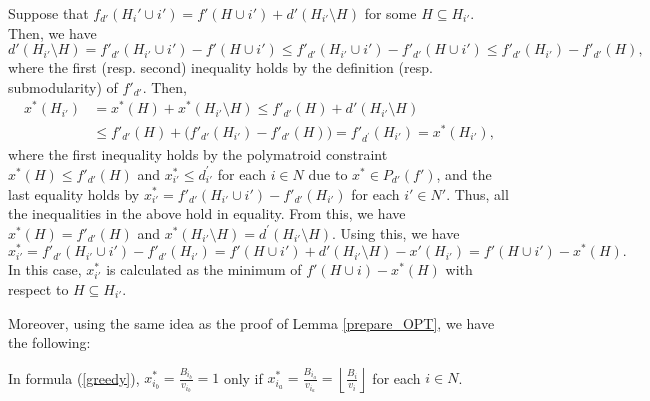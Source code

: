 \documentclass[letterpaper,11pt]{article}
\begin{document}
	Suppose that $f_{d'}(H_i'\cup i')=f'(H\cup i')+d'(H_{i'}\setminus H)$ for some $H\subseteq H_{i'}$.
	Then, we have 
	\[
	d'(H_{i'}\setminus H)=f'_{d'}(H_{i'}\cup i')-f'(H\cup i')\leq f'_{d'}(H_{i'}\cup i')-f'_{d'}(H\cup i')\leq f'_{d'}(H_{i'})-f'_{d'}(H),
	\]
	where the first (resp. second) inequality holds by the definition (resp. submodularity) of $f'_{d'}$.
	Then, 
	\begin{align*}
	x^{*}(H_{i'})&=x^{*}(H)+x^{*}(H_{i'}\setminus H)\leq f'_{d'}(H)+d'(H_{i'}\setminus H)\\
	&\leq f'_{d'}(H)+\bigl(f'_{d'}(H_{i'})-f'_{d'}(H)\bigr)=f'_{d^{'}}(H_{i'})=x^{*}(H_{i'}), 
	\end{align*}
	where the first inequality holds by the polymatroid constraint $x^{*}(H)\leq f'_{d'}(H)$ and 
	$x^{*}_{i'}\leq d^{'}_{i'}$ for each $i\in N$ due to $x^{*}\in P_{d'}(f')$, 
	and the last equality holds by $x^*_{i'}=f'_{d'}(H_{i'}\cup i')-f'_{d'}(H_{i'})$ for each $i'\in N'$.
	Thus, all the inequalities in the above hold in equality.
	From this, we have $x^{*}(H)=f'_{d'}(H)$ and $x^{*}(H_{i'}\setminus H)=d^{'}(H_{i'}\setminus H)$.
	Using this, we have 
	\[
	x^*_{i'}=f'_{d'}(H_{i'}\cup i')-f'_{d'}(H_{i'})=f'(H\cup {i'})+d'(H_{i'}\setminus H)-x'(H_{i'})
	=f'(H\cup i')-x^{*}(H).
	\]
	In this case, $x^*_{i'}$ is calculated as the minimum of $f'(H\cup i)-x^{*}(H)$ with respect to $H\subseteq H_{i'}$.
	
	Moreover, using the same idea as the proof of Lemma \ref{prepare_OPT}, we have the following:
	\begin{observation}
	\label{greedy_property}
	In formula (\ref{greedy}), $x^*_{i_{b}}=\frac{B_{i_b}}{v_{i_b}}=1$ only if $x^*_{i_{a}}
	=\frac{B_{i_a}}{v_{i_a}}=\left\lfloor \frac{B_i}{v_i}\right\rfloor$ for each $i\in N$. 
	\end{observation}

	
\end{document}
